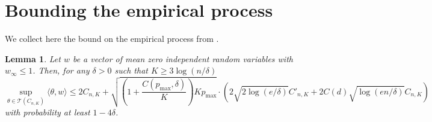 \documentclass{article}
\newcommand{\dotp}[2]{\langle #1, #2 \rangle}
\newcommand{\1}{\mathbb{I}}
\theoremstyle{alden}
\theoremstyle{aldenthm}
\newtheorem{lemma}{Lemma}
\theoremstyle{definition}
\theoremstyle{remark}
\begin{document}
\section{Bounding the empirical process}

We collect here the bound on the empirical process from \cite{padilla2018}.
\begin{lemma}
	\label{lem: empirical_process_TV_denoising}
	Let $w$ be a vector of mean zero independent random variables with ${w}_{\infty} \leq 1$. Then, for any $\delta > 0$ such that $K \geq 3 \log(n/\delta)$
	\begin{equation*}
	\sup_{\theta \in \mathcal{T}(C_{n,K})} \dotp{\theta}{w} \leq 2 C_{n,K} + \sqrt{(1 + \frac{C(p_{\max}, \delta)}{K})K p_{\max}} \cdot \left( 2 \sqrt{2 \log(e/ \delta)} C'_{n,K} + 2 C(d) \sqrt{\log(en/\delta)}C_{n,K} \right)
	\end{equation*}
	with probability at least $1 - 4 \delta$.
\end{lemma}
\end{document}

